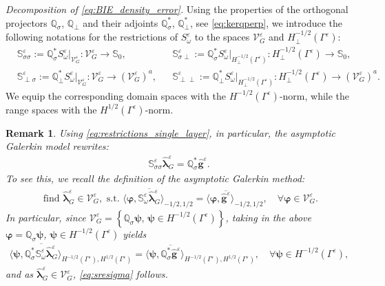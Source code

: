 \documentclass[]{article}
\newtheorem{remark}{Remark}
\numberwithin{equation}{section}
\numberwithin{theorem}{section}
\numberwithin{lemma}{section}
\numberwithin{corollary}{section}
\numberwithin{proposition}{section}
\numberwithin{definition}{section}
\newcommand{\bg}{\boldsymbol{g}}
\newcommand{\blambda}{\boldsymbol{\lambda}}
\newcommand{\re}{\varepsilon}
\renewcommand{\vec}{\boldsymbol}
\begin{document}
	\textit{Decomposition of \eqref{eq:BIE_density_error}. }
	Using the properties of the orthogonal projectors $\mathbb{Q}_{\sigma}$, $\mathbb{Q}_{\perp}$ and their adjoints $\mathbb{Q}^*_{\sigma}$, $\mathbb{Q}^*_{\perp}$, see \eqref{eq:kerqperp}, we introduce the following notations for the restrictions of $S^{\re}_{\omega}$ to the spaces $\mathcal{V}^{\re}_G$ and $H^{-1/2}_{\perp}(\Gamma^{\re})$:
	\begin{align}
		\label{eq:restrictions_single_layer}
		&\mathbb{S}^{\re}_{\sigma \sigma} := \mathbb{Q}^*_{\sigma} S^{\re}_{\omega}|_{\mathcal{V}^{\re}_G} : \mathcal{V}^{\re}_G \rightarrow  \mathbb{S}_0,  &&\mathbb{S}^{\re}_{\sigma \perp} := \mathbb{Q}^*_{\sigma} S^{\re}_{\omega}|_{H^{-1/2}_{\perp}(\Gamma^{\re})} : H^{-1/2}_{\perp}(\Gamma^{\re}) \rightarrow \mathbb{S}_0, \nonumber \\                                                                                                         
		&\mathbb{S}^{\re}_{\perp \sigma} := \mathbb{Q}^*_{\perp} S^{\re}_{\omega}|_{\mathcal{V}^{\re}_G} : \mathcal{V}^{\re}_G \rightarrow  (\mathcal{V}^{\re}_G)^a, 
		&&\mathbb{S}^{\re}_{\perp \perp} := \mathbb{Q}^*_{\perp} S^{\re}_{\omega}|_{H^{-1/2}_{\perp}(\Gamma^{\re})}  : H^{-1/2}_{\perp}(\Gamma^{\re}) \rightarrow  (\mathcal{V}^{\re}_G)^a.
	\end{align}
	We equip the corresponding domain spaces with the $H^{-1/2}(\Gamma^{\re})$-norm, while the range spaces with the $H^{1/2}(\Gamma^{\re})$-norm. 
	\begin{remark}
		Using \eqref{eq:restrictions_single_layer}, in particular, the asymptotic Galerkin model rewrites:
		\begin{align}
			\label{eq:sresigma}
			\mathbb{S}^{\re}_{\sigma\sigma}\hat{\blambda}^{\re}_G=\mathbb{Q}^{*}_{\sigma}\hat{\bg}^{\re}.	
		\end{align}
		To see this, we recall the definition of the asymptotic Galerkin method: 
		\begin{align*}%
			\text{ find } \hat{\blambda}^{\re}_G\in \mathcal{V}_{G}^{\re}, \text{ s.t.	}\langle \vec{\varphi}, \overline{\mathbb{S}^{\re}_{\omega}\hat{\blambda}^{\re}_G}\rangle_{-1/2, 1/2}=\langle \vec{\varphi}, \overline{\hat{\vec{g}}^{\re}}\rangle_{-1/2, 1/2}, \quad \forall\vec{\varphi} \in \mathcal{V}^{\re}_G.
		\end{align*}
		In particular, since  $\mathcal{V}^{\re}_G=\left\{\mathbb{Q}_{\sigma}\vec{\vec{\psi}},\, \vec{\psi}\in H^{-1/2}(\Gamma^{\re})\right\}$, taking in the above  $\vec{\varphi}=\mathbb{Q}_{\sigma}\vec{\psi}$, $\vec{\psi}\in H^{-1/2}(\Gamma^{\re})$ yields
		\begin{align*}%
			\langle \vec{\psi}, \overline{\mathbb{Q}_{\sigma}^*\mathbb{S}^{\re}_{\omega}\hat{\blambda}^{\re}_G}\rangle_{H^{-1/2}(\Gamma^{\re}), H^{1/2}(\Gamma^{\re})}=\langle \vec{\psi}, \overline{\mathbb{Q}_{\sigma}^*\hat{\vec{g}}^{\re}}\rangle_{H^{-1/2}(\Gamma^{\re}), H^{1/2}(\Gamma^{\re})}, \quad \vec{\forall }\vec{\psi}\in H^{-1/2}(\Gamma^{\re}),
		\end{align*}
		and as $\hat{\blambda}^{\re}_G\in \mathcal{V}_G^{\re}$,  \eqref{eq:sresigma} follows.
	\end{remark}	
\end{document}
